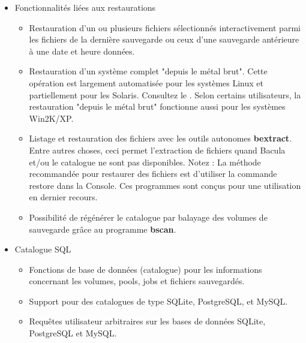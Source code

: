 \begin{itemize}
\item Fonctionnalit\'es li\'ees aux restaurations
   \begin{itemize}
     \item Restauration d'un ou plusieurs fichiers s\'electionn\'es interactivement
      parmi les fichiers  de la derni\`ere sauvegarde ou ceux d'une sauvegarde
      ant\'erieure \`a une date et heure donn\'ees.  
     \item Restauration d'un syst\`eme complet "depuis le m\'etal brut". 
      Cette op\'eration est largement  automatis\'ee pour les syst\`emes Linux et
      partiellement pour les Solaris.  Consultez le 
      . 
      Selon certains utilisateurs, la restauration "depuis le m\'etal brut" 
      fonctionne aussi pour les syst\`emes Win2K/XP.  
      \item Listage et restauration des fichiers avec les outils autonomes {\bf
      bextract}. Entre autres choses, ceci permet l'extraction de fichiers quand
      Bacula et/ou le  catalogue ne sont pas disponibles. Notez : La m\'ethode
      recommand\'ee pour restaurer des  fichiers est d'utiliser la commande restore
      dans la Console. Ces programmes sont  con\c{c}us pour une utilisation en
      dernier recours.  
      \item Possibilit\'e de r\'eg\'en\'erer le catalogue par balayage des volumes
      de sauvegarde  gr\^ace au programme {\bf bscan}.  
   \end{itemize}

\item Catalogue SQL 
  \begin{itemize}
    \item Fonctions de base de donn\'ees (catalogue) pour les informations
    concernant les volumes,  pools, jobs et fichiers sauvegard\'es.  
    \item Support pour des catalogues de type SQLite, PostgreSQL, et MySQL.  
    \item Requ\^etes utilisateur arbitraires sur les bases de donn\'ees SQLite,
    PostgreSQL et MySQL.  
  \end{itemize}


\end{itemize}

